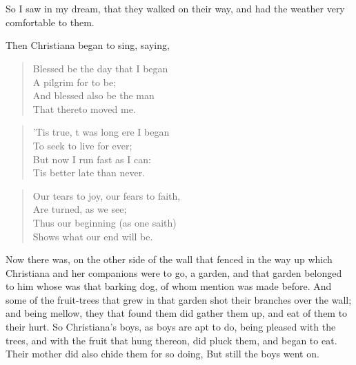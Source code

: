 \chapter[THE SECOND STAGE]{}

So I saw in my dream, that they walked on their way, and had the weather very comfortable to them.

Then Christiana began to sing, saying,
\begin{verse}
Blessed be the day that I began\\
A pilgrim for to be;\\
And blessed also be the man\\
That thereto moved me.\\
\end{verse}
\begin{verse}
'Tis true, t was long ere I began\\
To seek to live for ever;\\
But now I run fast as I can:\\
Tis better late than never.\\
\end{verse}
\begin{verse}
Our tears to joy, our fears to faith,\\
Are turned, as we see;\\
Thus our beginning (as one saith)\\
Shows what our end will be.\\
\end{verse}
Now there was, on the other side of the wall that fenced in the way up which Christiana and her companions were to go, a garden, and that garden belonged to him whose was that barking dog, of whom mention was made before. And some of the fruit-trees that grew in that garden shot their branches over the wall; and being mellow, they that found them did gather them up, and eat of them to their hurt. So Christiana's boys, as boys are apt to do, being pleased with the trees, and with the fruit that hung thereon, did pluck them, and began to eat. Their mother did also chide them for so doing, But still the boys went on.


